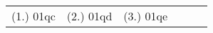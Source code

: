 \begin{eocexercises}{}
\begin{enumerate}
\end{enumerate}


\par \practiceinfo
\par \begin{tabular}[h]{cccccc}
(1.)	01qc	&
(2.)	01qd	&
(3.)	01qe	&
\end{tabular}

\end{eocexercises}









